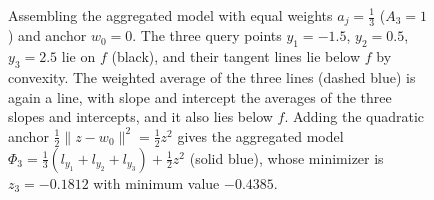 \begin{definition}
\begin{figure}[H]
			\caption{Assembling the aggregated model with equal weights $a_j = \frac{1}{3}$ ($A_3 = 1$) and anchor $w_0 = 0$. The three query points $y_1 = -1.5$, $y_2 = 0.5$, $y_3 = 2.5$ lie on $f$ (black), and their tangent lines lie below $f$ by convexity. The weighted average of the three lines (dashed blue) is again a line, with slope and intercept the averages of the three slopes and intercepts, and it also lies below $f$. Adding the quadratic anchor $\frac{1}{2}\|z - w_0\|^2 = \frac{1}{2}z^2$ gives the aggregated model $\Phi_3 = \frac{1}{3}(l_{y_1} + l_{y_2} + l_{y_3}) + \frac{1}{2}z^2$ (solid blue), whose minimizer is $z_3 = -0.1812$ with minimum value $-0.4385$.}
			\label{fig:agd-assembly}
		\end{figure}
	\end{definition}

